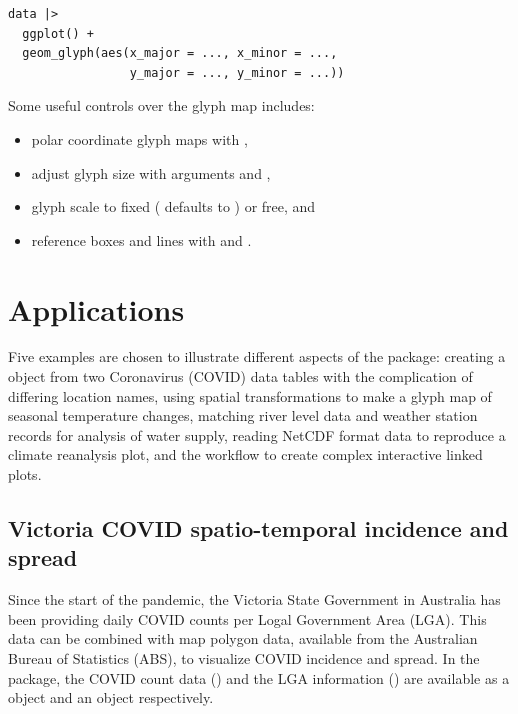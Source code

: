 \documentclass[
]{jss}
\providecommand{\tightlist}{%
  \setlength{\itemsep}{0pt}\setlength{\parskip}{0pt}}
\begin{document}
\begin{verbatim}
data |> 
  ggplot() +
  geom_glyph(aes(x_major = ..., x_minor = ..., 
                 y_major = ..., y_minor = ...))
\end{verbatim}

Some useful controls over the glyph map includes:

\begin{itemize}
\tightlist
\item
  polar coordinate glyph maps with ,
\item
  adjust glyph size with arguments  and ,
\item
  glyph scale to fixed ( defaults to )
  or free, and
\item
  reference boxes and lines with  and
  .
\end{itemize}

\hypertarget{examples}{%
\section{Applications}\label{examples}}

Five examples are chosen to illustrate different aspects of the
 package: creating a  object from two
Coronavirus (COVID) data tables with the complication of differing
location names, using spatial transformations to make a glyph map of
seasonal temperature changes, matching river level data and weather
station records for analysis of water supply, reading NetCDF format data
to reproduce a climate reanalysis plot, and the workflow to create
complex interactive linked plots.

\hypertarget{covid}{%
\subsection{Victoria COVID spatio-temporal incidence and
spread}\label{covid}}

Since the start of the pandemic, the Victoria State Government in
Australia has been providing daily COVID counts per Logal Government
Area (LGA). This data can be combined with map polygon data, available
from the Australian Bureau of Statistics (ABS), to visualize COVID
incidence and spread. In the  package, the COVID count data
() and the LGA information () are available as a
 object and an  object respectively.
\end{document}

